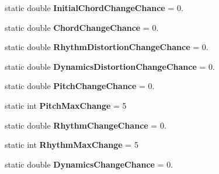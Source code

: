 \begin{DoxyCompactItemize}
\item 
\hypertarget{class_music_population_1_1_member2_a79fa86aa7fff7365e733e5daa686160e}{static double {\bfseries Initial\+Chord\+Change\+Chance} = 0.}\label{class_music_population_1_1_member2_a79fa86aa7fff7365e733e5daa686160e}

\item 
\hypertarget{class_music_population_1_1_member2_ae639e3e64ace1dd711c6410ff8fbd9a5}{static double {\bfseries Chord\+Change\+Chance} = 0.}\label{class_music_population_1_1_member2_ae639e3e64ace1dd711c6410ff8fbd9a5}

\item 
\hypertarget{class_music_population_1_1_member2_a854810e0c221d5d52b3b367f1b79ff18}{static double {\bfseries Rhythm\+Distortion\+Change\+Chance} = 0.}\label{class_music_population_1_1_member2_a854810e0c221d5d52b3b367f1b79ff18}

\item 
\hypertarget{class_music_population_1_1_member2_a96ffb908162ce83169c0a5ef43407b28}{static double {\bfseries Dynamics\+Distortion\+Change\+Chance} = 0.}\label{class_music_population_1_1_member2_a96ffb908162ce83169c0a5ef43407b28}

\item 
\hypertarget{class_music_population_1_1_member2_a63c9f376d6b094a2535d83a56c4d3030}{static double {\bfseries Pitch\+Change\+Chance} = 0.}\label{class_music_population_1_1_member2_a63c9f376d6b094a2535d83a56c4d3030}

\item 
\hypertarget{class_music_population_1_1_member2_a0c82bcef65296b921d0be3e5b3fc8f57}{static int {\bfseries Pitch\+Max\+Change} = 5}\label{class_music_population_1_1_member2_a0c82bcef65296b921d0be3e5b3fc8f57}

\item 
\hypertarget{class_music_population_1_1_member2_aedd0c5f9c974c64f7935138be1761d8f}{static double {\bfseries Rhythm\+Change\+Chance} = 0.}\label{class_music_population_1_1_member2_aedd0c5f9c974c64f7935138be1761d8f}

\item 
\hypertarget{class_music_population_1_1_member2_ac04a8e31cd3167d763b6ff76c09ff7e3}{static int {\bfseries Rhythm\+Max\+Change} = 5}\label{class_music_population_1_1_member2_ac04a8e31cd3167d763b6ff76c09ff7e3}

\item 
\hypertarget{class_music_population_1_1_member2_a4405fd9bdf51d621768ebc3585c4f601}{static double {\bfseries Dynamics\+Change\+Chance} = 0.}\label{class_music_population_1_1_member2_a4405fd9bdf51d621768ebc3585c4f601}


\end{DoxyCompactItemize}
